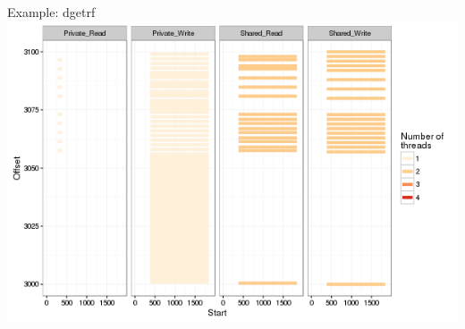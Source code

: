 \documentclass[xcolor={usenames,dvipsnames},hyperref={pdfusetitle}]{beamer}
\begin{document}
\begin{frame}{Example: dgetrf}
{{{            }{
                \includegraphics[width=\textwidth]{labbook-slides/intensity_Share_dgetrf_zoom-init1}
            }
        }
    }
    \pause
    \pause
    \pause
\end{frame}%

\end{document}

